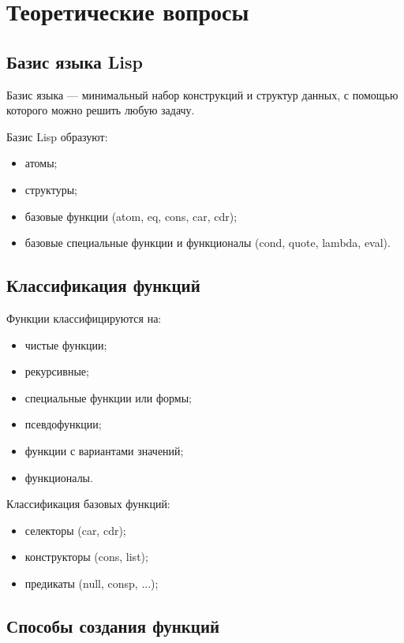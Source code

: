 \chapter{Теоретические вопросы}

\section{Базис языка Lisp}

Базис языка --- минимальный набор конструкций и структур данных, с помощью
которого можно решить любую задачу.

Базис Lisp образуют:
\begin{itemize}
    \item атомы;
    \item структуры;
    \item базовые функции (atom, eq, cons, car, cdr);
    \item базовые специальные функции и  функционалы (cond, quote, lambda, eval).
\end{itemize}

\section{Классификация функций}

Функции классифицируются на:

\begin{itemize}
    \item чистые функции;
    \item рекурсивные;
    \item специальные функции или формы;
    \item псевдофункции;
    \item функции с вариантами значений;
    \item функционалы.
\end{itemize}

Классификация базовых функций:
\begin{itemize}
    \item селекторы (car, cdr);
    \item конструкторы (cons, list);
    \item предикаты (null, consp, ...);
\end{itemize}


\section{Способы создания функций}

